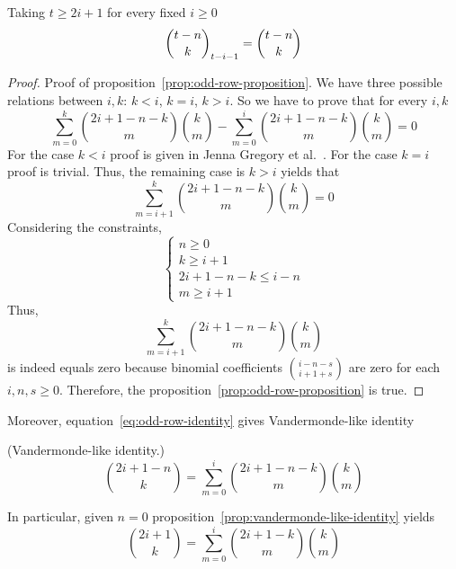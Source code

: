 Taking $t \geq 2i+1$ for every fixed $i \geq 0$
\begin{align*}
    \binom{t-n}{k}_{t-i-1}= \binom{t-n}{k}
\end{align*}
\begin{proof}
    Proof of proposition~\eqref{prop:odd-row-proposition}.
    We have three possible relations between $i,k$: $k<i$, $k=i$, $k > i$.
    So we have to prove that for every $i,k$
    \begin{equation*}
        \sum_{m=0}^{k} \binom{2i+1-n-k}{m} \binom{k}{m} - \sum_{m=0}^{i} \binom{2i+1-n-k}{m} \binom{k}{m} = 0
    \end{equation*}
    For the case $k<i$ proof is given in Jenna Gregory et al.~\cite{gregory2023iterated}.
    For the case $k=i$ proof is trivial.
    Thus, the remaining case is $k>i$ yields that
    \begin{equation*}
        \sum_{m=i+1}^{k} \binom{2i+1-n-k}{m} \binom{k}{m} = 0
    \end{equation*}
    Considering the constraints,
    \begin{equation*}
        \begin{cases}
            n \geq 0 \\
            k \geq i+1 \\
            2i+1-n-k \leq i-n \\
            m \geq i+1
        \end{cases}
    \end{equation*}
    Thus,
    \begin{equation*}
        \sum_{m=i+1}^{k} \binom{2i+1-n-k}{m} \binom{k}{m}
    \end{equation*}
    is indeed equals zero because binomial coefficients $\binom{i-n-s}{i+1+s}$ are zero for each $i, n, s \geq 0$.
    Therefore, the proposition~\eqref{prop:odd-row-proposition} is true.
\end{proof}
Moreover, equation~\eqref{eq:odd-row-identity} gives Vandermonde-like identity
\begin{proposition} (Vandermonde-like identity.)
    \label{prop:vandermonde-like-identity}
    \begin{equation*}
        \binom{2i+1-n}{k} = \sum_{m=0}^{i} \binom{2i+1-n-k}{m} \binom{k}{m}
    \end{equation*}
\end{proposition}
In particular, given $n=0$ proposition~\eqref{prop:vandermonde-like-identity} yields
\begin{equation*}
    \binom{2i+1}{k} = \sum_{m=0}^{i} \binom{2i+1-k}{m} \binom{k}{m}
\end{equation*}

